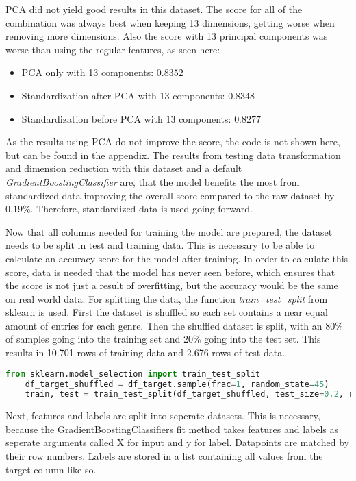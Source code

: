 \ac{PCA} did not yield good results in this dataset. The score for all of the combination was always best
when keeping 13 dimensions, getting worse when removing more dimensions. Also the score with 13 principal
components was worse than using the regular features, as seen here:

\begin{itemize}
    \item PCA only with 13 components: $0.8352$
    \item Standardization after PCA with 13 components: $0.8348$
    \item Standardization before PCA with 13 components: $0.8277$
\end{itemize}

As the results using \ac{PCA} do not improve the score, the code is not shown here, but can be found in the appendix.
The results from testing data transformation and dimension reduction with this dataset and a default \emph{GradientBoostingClassifier}
are, that the model benefits the most from standardized data improving the overall score compared to the raw dataset
by $0.19\%$. Therefore, standardized data is used going forward.

Now that all columns needed for training the model are prepared, the dataset needs to be split in 
test and training data. This is necessary to be able to calculate an accuracy score for the model after training.
In order to calculate this score, data is needed that the model has never seen before, which ensures that 
the score is not just a result of overfitting, but the accuracy would be the same on real world data.
For splitting the data, the function \emph{train\_test\_split} from sklearn is used.
First the dataset is shuffled so each set contains a near equal amount of entries for each genre.
Then the shuffled dataset is split, with an 80\% of samples going into the training set and 20\% going 
into the test set. This results in 10.701 rows of training data and 2.676 rows of test data.

\begin{lstlisting}[language=Python]
    from sklearn.model_selection import train_test_split
    df_target_shuffled = df_target.sample(frac=1, random_state=45)
    train, test = train_test_split(df_target_shuffled, test_size=0.2, random_state=45, shuffle=False)
\end{lstlisting}

Next, features and labels are split into seperate datasets. This is necessary, because the GradientBoostingClassifiers
fit method takes features and labels as seperate arguments called X for input and y for label. Datapoints are matched by their row numbers.
Labels are stored in a list containing all values from the target column like so.

